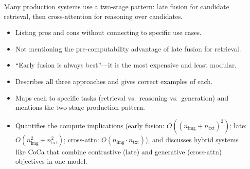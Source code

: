 \begin{interviewq}
Many production systems use a two-stage pattern: late fusion for candidate retrieval, then cross-attention for reasoning over candidates.

\redflags
\begin{itemize}
    \item Listing pros and cons without connecting to specific use cases.
    \item Not mentioning the pre-computability advantage of late fusion for retrieval.
    \item ``Early fusion is always best''---it is the most expensive and least modular.
\end{itemize}


\goodgreat
\begin{itemize}
    \item {} Describes all three approaches and gives correct examples of each.
    \item {} Maps each to specific tasks (retrieval vs.\ reasoning vs.\ generation) and mentions the two-stage production pattern.
    \item {} Quantifies the compute implications (early fusion: $O((n_{\text{img}} + n_{\text{txt}})^2)$; late: $O(n_{\text{img}}^2 + n_{\text{txt}}^2)$; cross-attn: $O(n_{\text{img}} \cdot n_{\text{txt}})$), and discusses hybrid systems like CoCa that combine contrastive (late) and generative (cross-attn) objectives in one model.
\end{itemize}

\end{interviewq}


